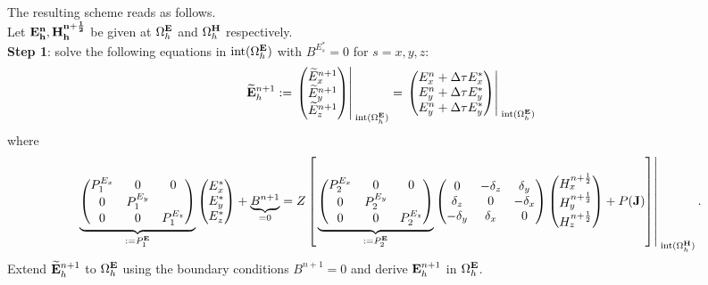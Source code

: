 \documentclass[12pt,reqno]{amsart}
\newcommand{\e}{{\bf E}}
\newcommand{\h}{{\bf H}}
\theoremstyle{definition}
\numberwithin{equation}{section}
\newcommand{\intr}[1]{\mathrm{int}(#1)}
\def\Gwh{\Omega_h}
\begin{document}
	The resulting scheme reads as follows.\\[1mm]
	Let $\bf{E}^n_h, \bf{H}^{n+\frac{1}{2}}_h$  be given at $\Gwh^{\e}$ and $\Gwh^{\h}$ respectively. \\[2mm]
	{\bf Step 1}: solve the following equations in $\intr{\Gwh^{\e}}$ with
	 $B^{E_s^*}=0$ for $s=x,y,z$: \\[2mm]
	$$
	\widetilde{\e}_h^{n+1}:=
	\left.
	\begin{pmatrix}
		\widetilde{E}_x^{n+1}\\
		\widetilde{E}_y^{n+1}\\
		\widetilde{E}_z^{n+1}
	\end{pmatrix}\right|_{\; \intr{\Gwh^{\e}}}^{\;}=
\left.
	\begin{pmatrix}
		E_x^n+\Delta \tau E_x^{*}\\
		E_y^n+\Delta \tau E_y^{*}\\
		E_y^n+\Delta \tau E_y^{*}
	\end{pmatrix}\right|_{\; \intr{\Gwh^{\e}}}^{\;}
	$$
	where 
	$$
	\underbrace{
	\begin{pmatrix}
		P_1^{E_x} & 0&0 \\
		0 & P_1^{E_y} &\\
		0&0&P_1^{E_z} 
	\end{pmatrix}
}_{:=P_1^\e}
	\begin{pmatrix}
		E_x^{*}\\
		E_y^{*} \\
		E_z^{*}
	\end{pmatrix}+\underbrace{B^{n+1}}_{=0}=Z
\left [ \left.
	\underbrace{
	\begin{pmatrix}
		P_2^{E_x} & 0&0 \\
		0 & P_2^{E_y} &\\
		0&0&P_2^{E_z} 
	\end{pmatrix}
}_{:=P_2^\e}
	\begin{pmatrix}
		0& -\delta_z & \delta _y\\
		\delta_z&0&-\delta_x\\
		-\delta_y&\delta_x&0
	\end{pmatrix}
	\begin{pmatrix}
		H_x^{n+\frac{1}{2}}\\
		H_y^{n+\frac{1}{2}}\\
		H_z^{n+\frac{1}{2}}
	\end{pmatrix}+P({\bf J})\right]\right|_{\; \intr{\Gwh^{\h}}}^{\;}.
	$$
	Extend $\widetilde{\e}_h^{n+1}$
to $\Gwh^\e$ using the boundary conditions $B^{n+1}=0$ and derive 
$\e_h^{n+1}$ in $\Gwh^\e$. 
\end{document}
